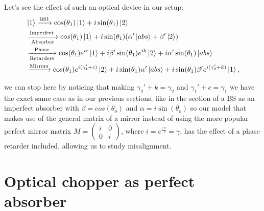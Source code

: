 \documentclass[12pt]{book}
\begin{document}
Let's see the effect of such an optical device in our setup:
\begin{align*}
&\ket{1}\xrightarrow{\text{BS1}}\cos(\theta_{1})\ket{1}+i\sin(\theta_{1})\ket{2}\\ &\xrightarrow[\text{Absorber}]{\text{Imperfect }}cos(\theta_{1})\ket{1}+i\sin(\theta_{1})(\alpha' \ket{abs} +\beta' \ket{2} )\\& \xrightarrow[\text{Retarders}]{\text{Phase}}\cos(\theta_{1})e^{ic}\ket{1}+i\beta'\sin(\theta_{1}) e^{ik}\ket{2} +i\alpha'\sin(\theta_{1}) \ket{abs}\\ &\xrightarrow{\text{Mirrors}} \cos(\theta_{1})e^{i(\gamma_{1}'+c)}\ket{2}+i \sin(\theta_{1})\alpha'\ket{abs}+i\sin(\theta_{1})\beta'e^{i(\gamma_{2}'+k)}\ket{1},
\end{align*}

we can stop here by noticing that making $\gamma_{2}'+k=\gamma_{2}$ and $\gamma_{1}'+c=\gamma_{1}$ we have the exact same case as in our previous sections, like in the section of a BS as an imperfect absorber with  $\beta=cos(\theta_{o})$ and $\alpha=i\sin(\theta_{o})$ so our model that makes use of the general matrix of a mirror instead of using the more popular perfect mirror matrix $M=\begin{pmatrix} i & 0\\0& i\end{pmatrix}$, where $i=e^{i \frac{\pi}{2}}=\gamma$, has the  effect of a phase retarder included, allowing us to study misalignment.
 
\pagebreak

\section{Optical chopper as perfect absorber }
 
\end{document}
